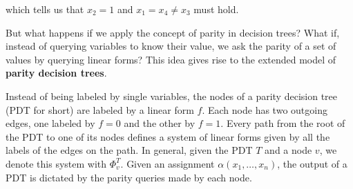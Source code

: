 which tells us that $x_2 = 1$ and $x_1 = x_4 \neq x_3$ must hold.

\newpage

But what happens if we apply the concept of parity in decision trees? What if, instead of querying variables to know their value, we ask the parity of a set of values by querying linear forms? This idea gives rise to the extended model of \textbf{parity decision trees}.

Instead of being labeled by single variables, the nodes of a parity decision tree (PDT for short) are labeled by a linear form $f$. Each node has two outgoing edges, one labeled by $f = 0$ and the other by $f = 1$. Every path from the root of the PDT to one of its nodes defines a system of linear forms given by all the labels of the edges on the path. In general, given the PDT $T$ and a node $v$, we denote this system with $\Phi_v^T$. Given an assignment $\alpha(x_1, \ldots, x_n)$, the output of a PDT is dictated by the parity queries made by each node.

